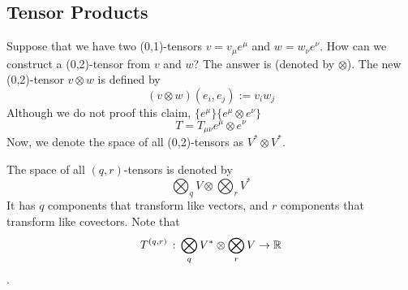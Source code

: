 \documentclass[a4paper, 10pt]{article}
\begin{document}
\subsection{Tensor Products}
\begin{example}
    Suppose that we have two (0,1)-tensors $v = v_{\mu}e^{\mu}$ and $w = w_{\nu}e^{\nu}$. How can we construct a (0,2)-tensor from $v$ and $w$? The answer is (denoted by $\otimes$). The new (0,2)-tensor $v \otimes w$ is defined by
    \[ (v \otimes w)(e_{i}, e_{j}) := v_{i} w_{j} \]
    Although we do not proof this claim,  $\{ e^{\mu} \}$\tit{, }$\{ e^{\mu} \otimes e^{\nu} \}$
    \[ T = T_{\mu\nu} e^{\mu} \otimes e^{\nu} \]
    Now, we denote the space of all (0,2)-tensors as $\boxed{V^{\ast} \otimes V^{\ast}}$.
\end{example}
\begin{definition}
    The space of all $(q,r)$-tensors is denoted by
    \[ \bigotimes_{q}V \otimes \bigotimes_{r} V^{\ast} \]
    It has $q$ components that transform like vectors, and $r$ components that transform like covectors. Note that
    \[ T^{(q,r)} \,:\, \bigotimes_{q} V^{\ast} \otimes \bigotimes_{r} V \rightarrow \mathbb{R} \]
    .
\end{definition}
\end{document}
